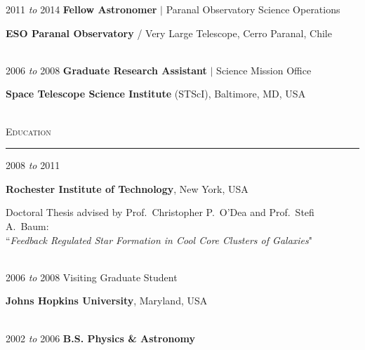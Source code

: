\documentclass[11pt]{article}
\makeatletter
\def\vhrulefill#1{\leavevmode\leaders\hrule\@height#1\hfill \kern\z@}
\makeatother
\begin{document}
\hspace{2.5mm} 2011 \textit{to} 2014 \hspace{17mm} \textbf{Fellow Astronomer} $|$ Paranal Observatory Science Operations

\hspace{42mm} \parbox{5.15in}{\textbf{ESO Paranal Observatory} / Very Large Telescope, Cerro Paranal, Chile} \\



\hspace{2.5mm} 2006 \textit{to} 2008 \hspace{17mm} \textbf{Graduate Research Assistant} $|$ Science Mission Office

\hspace{42mm} \parbox{5.15in}{\textbf{Space Telescope Science Institute} (STScI), Baltimore, MD, USA} \\



\textsc{Education} \vhrulefill{0.4pt}

\vspace{2mm}


\hspace{2.5mm}2008 \textit{to} 2011 

\hspace{42mm}\parbox{5.15in}{\textbf{Rochester Institute of Technology}, New York, USA \\}

\hspace{42mm} \parbox{5.15in}{Doctoral Thesis advised by Prof.~Christopher P.~O'Dea and Prof.~Stefi A.~Baum: \\ ``\textit{Feedback Regulated Star Formation in Cool Core Clusters of Galaxies}"} \\




\hspace{2.5mm}2006 \textit{to} 2008  \hspace{18mm} Visiting Graduate Student

\hspace{42mm} \parbox{5.15in}{\textbf{Johns Hopkins University}, Maryland, USA} \\



\hspace{2.5mm} 2002 \textit{to} 2006 \hspace{17mm} {\textbf{B.S. Physics \& Astronomy}}
\end{document}
